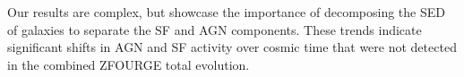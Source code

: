 Our results are complex, but showcase the importance of decomposing the SED of galaxies to separate the SF and AGN components. These trends indicate significant shifts in AGN and SF activity over cosmic time that were not detected in the combined ZFOURGE total evolution.







